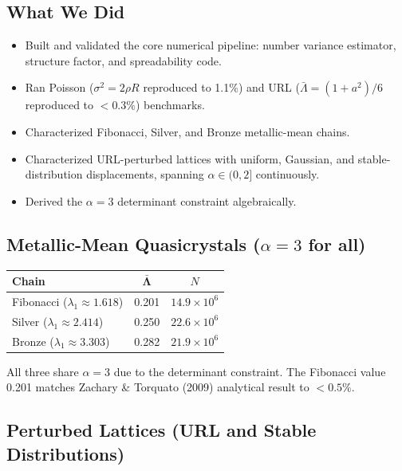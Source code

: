 \documentclass[11pt,letterpaper]{article}
\begin{document}
\subsection{What We Did}

\begin{itemize}[leftmargin=1.5em]
  \item Built and validated the core numerical pipeline:
    number variance estimator, structure factor, and spreadability code.
  \item Ran Poisson ($\sigma^2 = 2\rho R$ reproduced to 1.1\%) and URL
    ($\bar\Lambda=(1+a^2)/6$ reproduced to $<0.3\%$) benchmarks.
  \item Characterized Fibonacci, Silver, and Bronze metallic-mean chains.
  \item Characterized URL-perturbed lattices with uniform, Gaussian, and stable-distribution
    displacements, spanning $\alpha \in (0,2]$ continuously.
  \item Derived the $\alpha = 3$ determinant constraint algebraically.
\end{itemize}

\subsection{Metallic-Mean Quasicrystals ($\alpha = 3$ for all)}

\begin{table}[H]\centering
\begin{tabular}{lcc}
\toprule
\textbf{Chain} & $\boldsymbol{\bar{\Lambda}}$ & $N$ \\
\midrule
Fibonacci ($\lambda_1\approx1.618$) & 0.201 & $14.9\times10^6$ \\
Silver    ($\lambda_1\approx2.414$) & 0.250 & $22.6\times10^6$ \\
Bronze    ($\lambda_1\approx3.303$) & 0.282 & $21.9\times10^6$ \\
\bottomrule
\end{tabular}
\end{table}

All three share $\alpha = 3$ due to the determinant constraint. The Fibonacci value 0.201
matches Zachary \& Torquato (2009) analytical result to $<0.5\%$.

\subsection{Perturbed Lattices (URL and Stable Distributions)}
\end{document}
